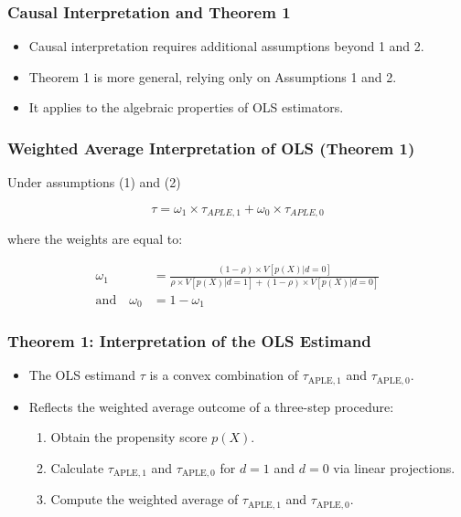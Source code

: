 \documentclass{beamer}
\begin{document}
\begin{frame}
\frametitle{Causal Interpretation and Theorem 1}
\begin{itemize}
    \item Causal interpretation requires additional assumptions beyond 1 and 2.
    \item Theorem 1 is more general, relying only on Assumptions 1 and 2.
    \item It applies to the algebraic properties of OLS estimators.
\end{itemize}
\end{frame}


\begin{frame}
\frametitle{Weighted Average Interpretation of OLS (Theorem 1)}

Under assumptions (1) and (2)

$$\tau = \omega_1 \times \tau_{APLE,1} + \omega_0 \times \tau_{APLE,0}$$
 
 where the weights are equal to:
 
\begin{align*}
\omega_1 &= \frac{(1-\rho) \times V[p(X)|d=0]}{\rho \times V[p(X)|d=1] + (1-\rho) \times V[p(X)|d=0]} \\
\text{and} \quad \omega_0 &= 1 - \omega_1
\end{align*}

\end{frame}



\begin{frame}
\frametitle{Theorem 1: Interpretation of the OLS Estimand}
\begin{itemize}
    \item The OLS estimand \( \tau \) is a convex combination of \( \tau_{\text{APLE},1} \) and \( \tau_{\text{APLE},0} \).
    \item Reflects the weighted average outcome of a three-step procedure:
    \begin{enumerate}
        \item Obtain the propensity score \( p(X) \).
        \item Calculate \( \tau_{\text{APLE},1} \) and \( \tau_{\text{APLE},0} \) for \( d = 1 \) and \( d = 0 \) via linear projections.
        \item Compute the weighted average of \( \tau_{\text{APLE},1} \) and \( \tau_{\text{APLE},0} \).
    \end{enumerate}
\end{itemize}
\end{frame}
\end{document}
